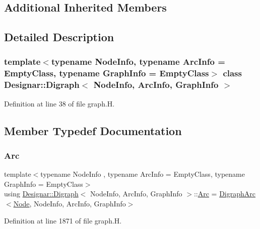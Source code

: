 \subsection*{Additional Inherited Members}


\subsection{Detailed Description}
\subsubsection*{template$<$typename Node\+Info, typename Arc\+Info = Empty\+Class, typename Graph\+Info = Empty\+Class$>$\newline
class Designar\+::\+Digraph$<$ Node\+Info, Arc\+Info, Graph\+Info $>$}



Definition at line 38 of file graph.\+H.



\subsection{Member Typedef Documentation}
\mbox{\label{class_designar_1_1_digraph_a0ceb278671f2a535c00fddccdeafd69f}} 
\subsubsection{\texorpdfstring{Arc}{Arc}}
{\footnotesize\ttfamily template$<$typename Node\+Info , typename Arc\+Info  = Empty\+Class, typename Graph\+Info  = Empty\+Class$>$ \\
using \hyperlink{class_designar_1_1_digraph}{Designar\+::\+Digraph}$<$ Node\+Info, Arc\+Info, Graph\+Info $>$\+::\hyperlink{class_designar_1_1_digraph_a0ceb278671f2a535c00fddccdeafd69f}{Arc} =  \hyperlink{class_designar_1_1_digraph_arc}{Digraph\+Arc}$<$\hyperlink{class_designar_1_1_digraph_a4dc921c41a480b7946a04170e997d8ae}{Node}, Node\+Info, Arc\+Info, Graph\+Info$>$}



Definition at line 1871 of file graph.\+H.

\mbox{\label{class_designar_1_1_digraph_a84a736f6c32da0fcbd1d047e74264d00}} 

